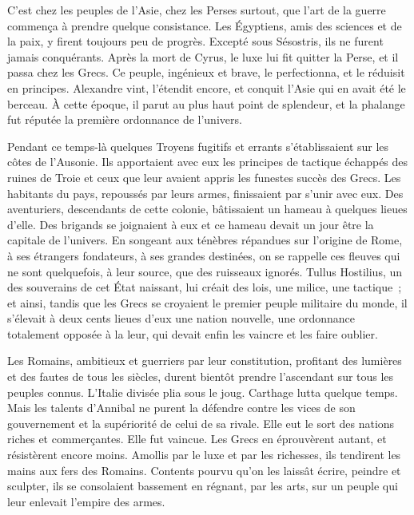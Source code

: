 \documentclass[french,twoside]{book} %
\begin{document}
C’est chez les peuples de l’Asie, chez les Perses surtout, que l’art de la guerre commença à prendre quelque consistance. Les Égyptiens, amis des sciences et de la paix, y firent toujours peu de progrès. Excepté sous Sésostris, ils ne furent jamais conquérants. Après la mort de Cyrus, le luxe lui fit quitter la Perse, et il passa chez les Grecs. Ce peuple, ingénieux et brave, le perfectionna, et le réduisit en principes. Alexandre vint, l’étendit encore, et conquit l’Asie qui en avait été le berceau. À cette époque, il parut au plus haut point de splendeur, et la phalange fut réputée la première ordonnance de l’univers.\par
Pendant ce temps-là quelques Troyens fugitifs et errants s’établissaient sur les côtes de l’Ausonie. Ils apportaient avec eux les principes de tactique échappés des ruines de Troie et ceux que leur avaient appris les funestes succès des Grecs. Les habitants du pays, repoussés par leurs armes, finissaient par s’unir avec eux. Des aventuriers, descendants de cette colonie, bâtissaient un hameau à quelques lieues d’elle. Des brigands se joignaient à eux et ce hameau devait un jour être la capitale de l’univers. En songeant aux ténèbres répandues sur l’origine de Rome, à ses étrangers fondateurs, à ses grandes destinées, on se rappelle ces fleuves qui ne sont quelquefois, à leur source, que des ruisseaux ignorés. Tullus Hostilius, un des souverains de cet État naissant, lui créait des lois, une milice, une tactique ; et ainsi, tandis que les Grecs se croyaient le premier peuple militaire du monde, il s’élevait à deux cents lieues d’eux une nation nouvelle, une ordonnance totalement opposée à la leur, qui devait enfin les vaincre et les faire oublier.\par
Les Romains, ambitieux et guerriers par leur constitution, profitant des lumières et des fautes de tous les siècles, durent bientôt prendre l’ascendant sur tous les peuples connus. L’Italie divisée plia sous le joug. Carthage lutta quelque temps. Mais les talents d’Annibal ne purent la défendre contre les vices de son gouvernement et la supériorité de celui de sa rivale. Elle eut le sort des nations riches et commerçantes. Elle fut vaincue. Les Grecs en éprouvèrent autant, et résistèrent encore moins. Amollis par le luxe et par les richesses, ils tendirent les mains aux fers des Romains. Contents pourvu qu’on les laissât écrire, peindre et sculpter, ils se consolaient bassement en régnant, par les arts, sur un peuple qui leur enlevait l’empire des armes.\par
\end{document}
